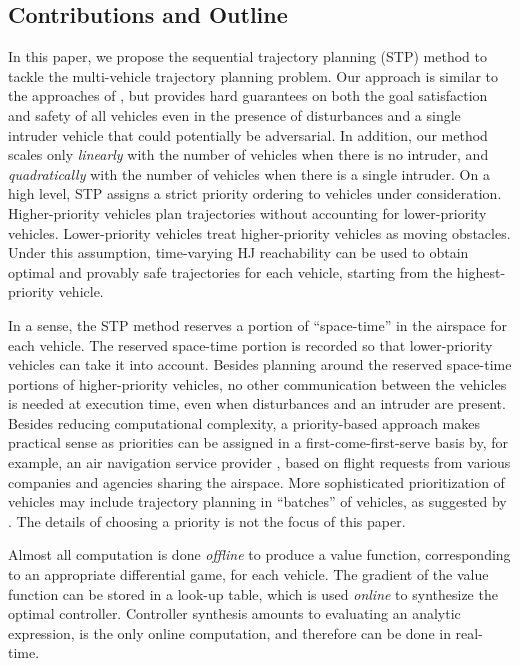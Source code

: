 \subsection{Contributions and Outline}
In this paper, we propose the sequential trajectory planning (STP) method to tackle the multi-vehicle trajectory planning problem. 
Our approach is similar to the approaches of \cite{Erdmann1987, VandenBerg2005}, but provides hard guarantees on both the goal satisfaction and safety of all vehicles even in the presence of disturbances and a single intruder vehicle that could potentially be adversarial. 
In addition, our method scales only \textit{linearly} with the number of vehicles when there is no intruder, and \textit{quadratically} with the number of vehicles when there is a single intruder.
On a high level, STP assigns a strict priority ordering to vehicles under consideration. 
Higher-priority vehicles plan trajectories without accounting for lower-priority vehicles. 
Lower-priority vehicles treat higher-priority vehicles as moving obstacles. 
Under this assumption, time-varying HJ reachability \cite{Bokanowski11, Fisac15} can be used to obtain optimal and provably safe trajectories for each vehicle, starting from the highest-priority vehicle. 

In a sense, the STP method reserves a portion of ``space-time'' in the airspace for each vehicle. The reserved space-time portion is recorded so that lower-priority vehicles can take it into account. Besides planning around the reserved space-time portions of higher-priority vehicles, no other communication between the vehicles is needed at execution time, even when disturbances and an intruder are present. Besides reducing computational complexity, a priority-based approach makes practical sense as priorities can be assigned in a first-come-first-serve basis by, for example, an air navigation service provider \cite{Kopardekar16}, based on flight requests from various companies and agencies sharing the airspace. More sophisticated prioritization of vehicles may include trajectory planning in ``batches'' of vehicles, as suggested by \cite{LaValle1998a}. The details of choosing a priority is not the focus of this paper.

Almost all computation is done \textit{offline} to produce a value function, corresponding to an appropriate differential game, for each vehicle. 
The gradient of the value function can be stored in a look-up table, which is used \textit{online} to synthesize the optimal controller.
Controller synthesis amounts to evaluating an analytic expression, is the only online computation, and therefore can be done in real-time.

